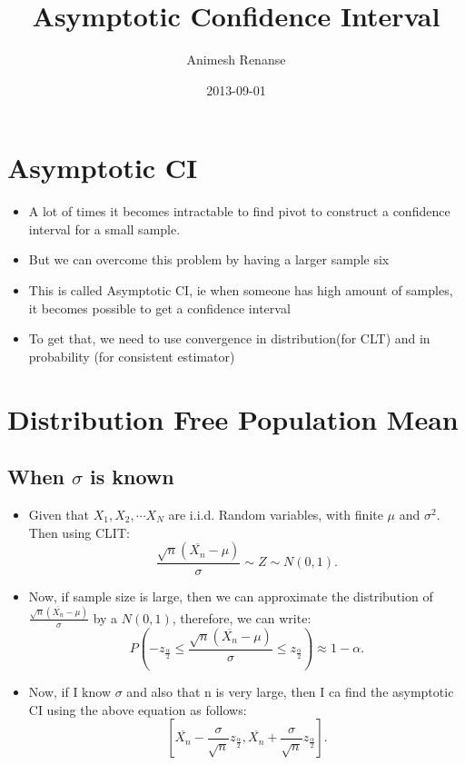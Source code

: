 \documentclass[a4paper]{article}
\title{Asymptotic Confidence Interval}
\date{2013-09-01}
\author{Animesh Renanse}
\begin{document}
\maketitle
\newpage

\section{Asymptotic CI}

\begin{itemize}
	\item{A lot of times it becomes intractable to find pivot to construct a confidence interval for a small sample.}
	\item{But we can overcome this problem by having a larger sample six}
	\item{This is called Asymptotic CI, ie when someone has high amount of samples, it becomes possible to get a confidence interval}
	\item{To get that, we need to use convergence in distribution(for CLT) and in probability (for consistent estimator)}

\end{itemize}

\section{Distribution Free Population Mean}

\subsection{When $\sigma$ is known}

\begin{itemize}
	\item{Given that $X_1, X_2, \cdots X_N$ are i.i.d. Random variables, with finite $\mu$ and $\sigma^2$. Then using CLIT: \[
				\frac{\sqrt{n} \left( \overline{X_n}	- \mu \right) }{\sigma} \sim Z \sim N(0,1) 	
	.\] 

}

	\item{Now, if sample size is large, then we can approximate the distribution of $\frac{\sqrt{n} \left( \overline{X_n}	- \mu \right) }{\sigma}$  by a $N(0,1)$, therefore, we can write:
		\[
			P\left( -z_{\frac{\alpha}{2}} \le	\frac{\sqrt{n} \left( \overline{X_n}	- \mu \right) }{\sigma} \le z_\frac{\alpha}{2}  \right) \approx 1 - \alpha
		.\] }


	\item{Now, if I know $\sigma$ and also that n is very large, then I ca find the asymptotic CI using the above equation as follows:
		\[
			\left[ \overline{ X_n} - \frac{\sigma}{\sqrt{n} }z_\frac{\alpha}{2}, \overline{X_n} + \frac{\sigma}{\sqrt{n} }z_\frac{\alpha}{2}   \right] 
		.\] }
\end{itemize}
\end{document}
